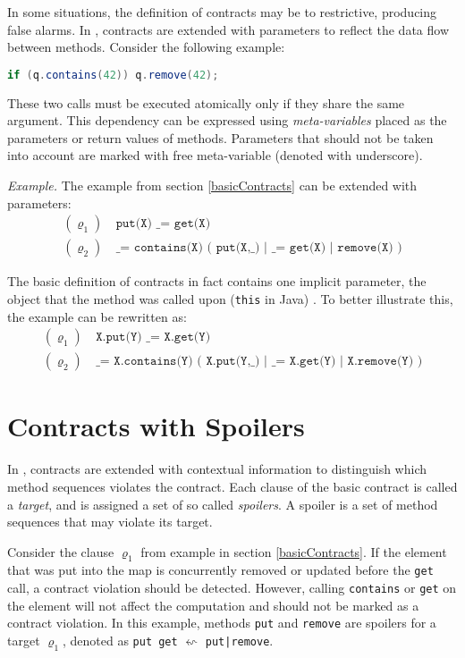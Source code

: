 In some situations, the definition of contracts may be to restrictive, producing
false alarms. In \cite{contracts}, contracts are extended with parameters to
reflect the data flow between methods. Consider the following example:
\begin{lstlisting}[language=java]
if (q.contains(42)) q.remove(42);
\end{lstlisting}

These two calls must be executed atomically only if they share the same
argument. This dependency can be expressed using \emph{meta-variables} placed as
the parameters or return values of methods. Parameters that should not be taken
into account are marked with free meta-variable (denoted with underscore).

\emph{Example.} The example from section \ref{basicContracts} can be extended
with parameters:
\begin{align*}
    (\varrho_1) &\ \texttt{put(X) \_ = get(X)}\\
    (\varrho_2) &\ \texttt{\_ = contains(X) ( put(X,\_) | \_ = get(X) |
    remove(X) )}
\end{align*}

The basic definition of contracts in fact contains one implicit parameter, the
object that the method was called upon (\texttt{this} in Java)
\cite{FITPUB10817}. To better illustrate this, the example can be rewritten as:
\begin{align*}
    (\varrho_1) &\ \texttt{X.put(Y) \_ = X.get(Y)}\\
    (\varrho_2) &\ \texttt{\_ = X.contains(Y) ( X.put(Y,\_) | \_ = X.get(Y) |
    X.remove(Y) )}
\end{align*}


\section{Contracts with Spoilers}
\label{contractsWithSpoilers}

In \cite{contracts}, contracts are extended with contextual information to
distinguish which method sequences violates the contract. Each clause of the
basic contract is called a \emph{target}, and is assigned a set of so called
\emph{spoilers}. A spoiler is a set of method sequences that may violate its
target.

Consider the clause $\varrho_1$ from example in section \ref{basicContracts}. If
the element that was put into the map is concurrently removed or updated before
the \texttt{get} call, a contract violation should be detected.  However,
calling \texttt{contains} or \texttt{get} on the element will not affect the
computation and should not be marked as a contract violation. In this example,
methods \texttt{put} and \texttt{remove} are spoilers for a target
$\varrho_1$, denoted as \texttt{put get} $\leftsquigarrow$ \texttt{put|remove}.


